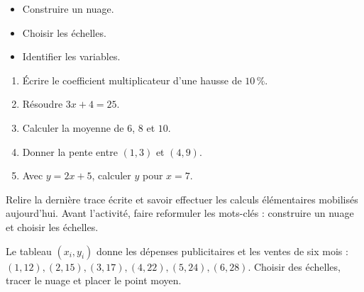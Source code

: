 \begin{objectifs}\begin{itemize}\item Construire un nuage.\item Choisir les échelles.\item Identifier les variables.\end{itemize}\end{objectifs}
\begin{automatismes}\begin{enumerate}\item Écrire le coefficient multiplicateur d'une hausse de $10\,\%$. \item Résoudre $3x+4=25$. \item Calculer la moyenne de $6$, $8$ et $10$. \item Donner la pente entre $(1,3)$ et $(4,9)$. \item Avec $y=2x+5$, calculer $y$ pour $x=7$. \end{enumerate}\end{automatismes}
\begin{prerequis}Relire la dernière trace écrite et savoir effectuer les calculs élémentaires mobilisés aujourd'hui. Avant l'activité, faire reformuler les mots-clés : construire un nuage et choisir les échelles.\end{prerequis}

\begin{activite}
Le tableau $(x_i,y_i)$ donne les dépenses publicitaires et les ventes de six mois : $(1,12),(2,15),(3,17),(4,22),(5,24),(6,28)$. Choisir des échelles, tracer le nuage et placer le point moyen.
\begin{center}\end{center}
\end{activite}

